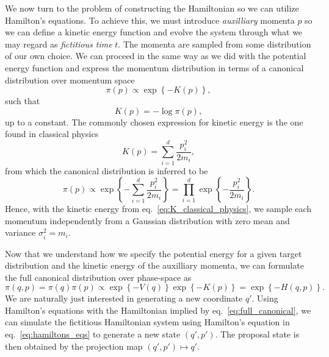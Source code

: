 We now turn to the problem of constructing the Hamiltonian so we can utilize Hamilton's equations.
To achieve this, we must introduce \textit{auxilliary} momenta $p$ so we can define a kinetic energy function
and evolve the system through what we may regard as \textit{fictitious time} $t$. 
The momenta are sampled from some distribution of our own choice. We can proceed in the same way as we did
with the potential energy function and express the momentum distribution in terms of a canonical distribution
over momentum space
\begin{equation}
  \pi(p) \propto \exp\left\{-K(p)\right\},
\end{equation}
such that
\begin{equation}
  K(p) = -\log \pi (p),
\end{equation}
up to a constant. The commonly chosen expression for kinetic energy is 
the one found in classical physics
\begin{equation}\label{eq:K_classical_physics}
  K(p) = \sum_{i=1}^d \frac{p_i^2}{2m_i},
\end{equation}
from which the canonical distribution is inferred to be
\begin{equation}\label{eq:canonical_p}
  \pi(p) \propto \exp\left\{-\sum_{i=1}^d \frac{p_i^2}{2m_i}\right\} = \prod_{i=1}^d \exp\left\{-\frac{p_i^2}{2m_i}\right\}.
\end{equation}
Hence, with the kinetic energy from eq.~\eqref{eq:K_classical_physics}, we 
sample each momentum independently from a Gaussian distribution with zero mean and variance $\sigma_i^2 = m_i$.

Now that we understand how we specify the potential energy for a given target distribution and
the kinetic energy of the auxilliary momenta, we can formulate the full canonical distribution over phase-space as
\begin{equation}\label{eq:full_canonical}
  \pi(q, p) = \pi(q)\pi(p) \propto \exp\left\{-V(q)\right\}\exp\left\{-K(p)\right\} = \exp\left\{-H(q, p)\right\}.
\end{equation}
We are naturally just interested in generating a new coordinate $q'$. Using Hamilton's equations
with the Hamiltonian implied by eq.~\eqref{eq:full_canonical}, we can simulate the fictitious Hamiltonian
system using Hamilton's equation in eq.~\eqref{eq:hamiltons_eqs} to generate a new state $(q', p')$. The proposal state
is then obtained by the projection map $(q', p') \mapsto q'$. 

